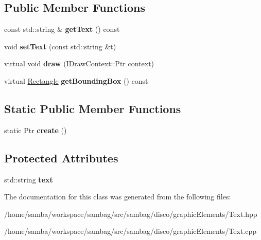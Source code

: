 \subsection*{Public Member Functions}
\begin{DoxyCompactItemize}
\item 
\hypertarget{classsambag_1_1disco_1_1graphic_elements_1_1_text_ab73f32dd227c78ddefb5357522ab2baf}{
const std::string \& {\bfseries getText} () const }
\label{classsambag_1_1disco_1_1graphic_elements_1_1_text_ab73f32dd227c78ddefb5357522ab2baf}

\item 
\hypertarget{classsambag_1_1disco_1_1graphic_elements_1_1_text_a7c5920f2c6400af383946f1b062eec3c}{
void {\bfseries setText} (const std::string \&t)}
\label{classsambag_1_1disco_1_1graphic_elements_1_1_text_a7c5920f2c6400af383946f1b062eec3c}

\item 
\hypertarget{classsambag_1_1disco_1_1graphic_elements_1_1_text_af3d987555f6e629c3c31b7c90d6c4b0b}{
virtual void {\bfseries draw} (IDrawContext::Ptr context)}
\label{classsambag_1_1disco_1_1graphic_elements_1_1_text_af3d987555f6e629c3c31b7c90d6c4b0b}

\item 
\hypertarget{classsambag_1_1disco_1_1graphic_elements_1_1_text_ae7ed81493c7b96404916ab79fc1bffab}{
virtual \hyperlink{classsambag_1_1com_1_1_rectangle}{Rectangle} {\bfseries getBoundingBox} () const }
\label{classsambag_1_1disco_1_1graphic_elements_1_1_text_ae7ed81493c7b96404916ab79fc1bffab}

\end{DoxyCompactItemize}
\subsection*{Static Public Member Functions}
\begin{DoxyCompactItemize}
\item 
\hypertarget{classsambag_1_1disco_1_1graphic_elements_1_1_text_a1fd50ac4a2b3aaa7a5151079efa2f414}{
static Ptr {\bfseries create} ()}
\label{classsambag_1_1disco_1_1graphic_elements_1_1_text_a1fd50ac4a2b3aaa7a5151079efa2f414}

\end{DoxyCompactItemize}
\subsection*{Protected Attributes}
\begin{DoxyCompactItemize}
\item 
\hypertarget{classsambag_1_1disco_1_1graphic_elements_1_1_text_a0b0d752d402b082b06eb6e8b52b683af}{
std::string {\bfseries text}}
\label{classsambag_1_1disco_1_1graphic_elements_1_1_text_a0b0d752d402b082b06eb6e8b52b683af}

\end{DoxyCompactItemize}


The documentation for this class was generated from the following files:\begin{DoxyCompactItemize}
\item 
/home/samba/workspace/sambag/src/sambag/disco/graphicElements/Text.hpp\item 
/home/samba/workspace/sambag/src/sambag/disco/graphicElements/Text.cpp\end{DoxyCompactItemize}
